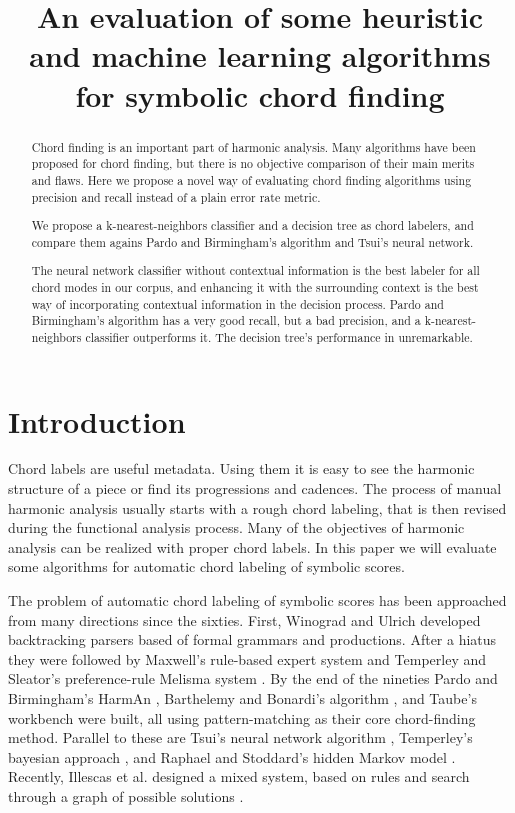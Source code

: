 \documentclass{article}
\title{An evaluation of some heuristic and machine learning algorithms for
  symbolic chord finding} \oneauthor {}{}
\begin{document}
\graphicspath{{figs/}{data/}}
\maketitle

\begin{abstract}

  Chord finding is an important part of harmonic analysis. Many
  algorithms have been proposed for chord finding, but there is no
  objective comparison of their main merits and flaws. Here we propose
  a novel way of evaluating chord finding algorithms using precision
  and recall instead of a plain error rate metric.
  
  We propose a k-nearest-neighbors classifier and a decision tree as
  chord labelers, and compare them agains Pardo and Birmingham's
  algorithm and Tsui's neural network.
  
  The neural network classifier without contextual information is the
  best labeler for all chord modes in our corpus, and enhancing it
  with the surrounding context is the best way of incorporating
  contextual information in the decision process. Pardo and
  Birmingham's algorithm has a very good recall, but a bad precision,
  and a k-nearest-neighbors classifier outperforms it. The decision
  tree's performance in unremarkable.


\end{abstract}

\section{Introduction}
\label{sec:introduction}

Chord labels are useful metadata. Using them it is easy to see the
harmonic structure of a piece or find its progressions and
cadences. The process of manual harmonic analysis usually starts with
a rough chord labeling, that is then revised during the functional
analysis process. Many of the objectives of harmonic analysis can be
realized with proper chord labels. In this paper we will evaluate some
algorithms for automatic chord labeling of symbolic scores.

The problem of automatic chord labeling of symbolic scores has been
approached from many directions since the sixties. First, Winograd
\cite{winograd68:linguistics} and Ulrich \cite{ulrich77:analysis}
developed backtracking parsers based of formal grammars and
productions. After a hiatus they were followed by Maxwell's
\cite{maxwell92:expert} rule-based expert system and Temperley and
Sleator's preference-rule Melisma system
\cite{temperley.ea99:modeling}. By the end of the nineties Pardo and
Birmingham's HarmAn \cite{barthelemy.ea01:figured}, Barthelemy and
Bonardi's algorithm \cite{pardo.ea02:algorithms}, and Taube's
workbench \cite{taube99:automatic} were built, all using
pattern-matching as their core chord-finding method. Parallel to these
are Tsui's neural network algorithm \cite{tsui02:harmonic}, Temperley's
bayesian approach \cite{temperley04:bayesian}, and Raphael and
Stoddard's hidden Markov model \cite{raphael.ea03:harmonic}. Recently,
Illescas et al. designed a mixed system, based on rules and search
through a graph of possible solutions \cite{illescas.ea07:harmonic}.
\end{document}
